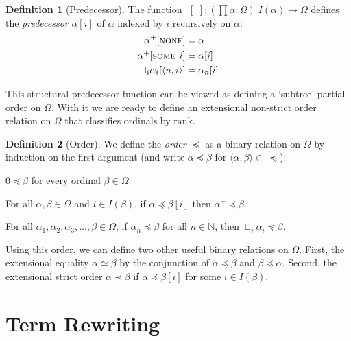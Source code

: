 \documentclass[11pt,oneside,a4paper,final]{report}
\theoremstyle{definition}
\newtheorem{definition}{Definition}
\begin{document}
\begin{definition}[Predecessor]
The function $\_[\_] : (\prod \alpha : \Omega) \; I(\alpha) \rightarrow
\Omega$ defines the \emph{predecessor} $\alpha[i]$ of $\alpha$ indexed by $i$
recursively on $\alpha$:
\begin{align*}
  \alpha^+[\textsc{none}]                 &= \alpha \\
  \alpha^+[\textsc{some $i$}]             &= \alpha[i] \\
  \sqcup_i \alpha_i[\langle n, i \rangle] &= \alpha_n[i]
\end{align*}
\end{definition}


This structural predecessor function can be viewed as defining a `subtree'
partial order on $\Omega$. With it we are ready to define an extensional
non-strict order relation on $\Omega$ that classifies ordinals by rank.

\begin{definition}[Order]
We define the \emph{order} $\preceq$ as a binary relation on $\Omega$ by
induction on the first argument (and write $\alpha \preceq \beta$ for $\langle
\alpha, \beta \rangle \in \; \preceq$):
\begin{compactenum}
  \item
    $0 \preceq \beta$ for every ordinal $\beta \in \Omega$.
  \item
    For all $\alpha, \beta \in \Omega$ and $i \in I(\beta)$, if $\alpha
    \preceq \beta[i]$ then $\alpha^+ \preceq \beta$.
  \item
    For all $\alpha_1, \alpha_2, \alpha_3, \ldots, \beta \in \Omega$, if
    $\alpha_n \preceq \beta$ for all $n \in \mathbb{N}$, then $\sqcup_i
    \alpha_i \preceq \beta$.
\end{compactenum}
\end{definition}

Using this order, we can define two other useful binary relations on
$\Omega$. First, the extensional equality $\alpha \simeq \beta$ by the
conjunction of $\alpha \preceq \beta$ and $\beta \preceq \alpha$. Second, the
extensional strict order $\alpha \prec \beta$ if $\alpha \preceq \beta[i]$ for
some $i \in I(\beta)$.


\section{Term Rewriting}\label{sec:trs}
\end{document}
